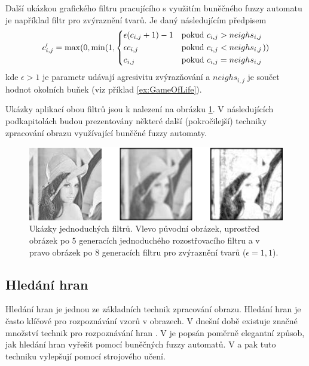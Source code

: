 \documentclass[a4paper,10pt]{article}
\begin{document}
Další ukázkou grafického filtru pracujícího s využitím buněčného fuzzy automatu je například filtr pro zvýraznění tvarů. Je daný následujícím předpisem
$$
  c'_{i,j} = \max(0, \min(1, 
    \begin{dcases}
      \epsilon (c_{i,j} + 1) - 1	& \text{pokud $c_{i,j} > neighs_{i,j}$} \\
      \epsilon c_{i,j}			& \text{pokud $c_{i,j} < neighs_{i,j}$} \\
      c_{i,j}	& \text{pokud $c_{i,j} = neighs_{i,j}$} 
    \end{dcases}
    ))
$$
kde $\epsilon > 1$ je parametr udávají agresivitu zvýrazňování a $neighs_{i,j}$ je součet hodnot okolních buňek (viz příklad \ref{ex:GameOfLife}).

Ukázky aplikací obou filtrů jsou k nalezení na obrázku \ref{img:Filters}. V následujících podkapitolách budou prezentovány některé další (pokročilejší) techniky zpracování obrazu využívající buněčné fuzzy automaty.

\begin{figure}[]
 \includegraphics[width=\textwidth]{filters}
 
 \caption{Ukázky jednoduchých filtrů. Vlevo původní obrázek, uprostřed obrázek po $5$ generacích jednoduchého rozostřovacího filtru a v pravo obrázek po $8$ generacích filtru pro zvýraznění tvarů ($\epsilon = 1,1$).} \label{img:Filters}
\end{figure}

\subsection{Hledání hran}
Hledání hran je jednou ze základních technik zpracování obrazu. Hledání hran je často klíčové pro rozpoznávání vzorů v obrazech. V dnešní době existuje značné množství technik pro rozpoznávání hran \cite{MaiAgg-StuComVarImDetEdTec}. V \cite{MarMeySol-HybMetGasDifModFuzCelAutImSha} je popsán poměrně elegantní způsob, jak hledání hran vyřešit pomocí buněčných fuzzy automatů. V \cite{PatMor-EdgDetTecFuzzLogCEllLeaAutFuzzImPro} a \cite{PatMor-EdgDetTecFuzzLogCEllLeaAutFuzzImPro} pak tuto techniku vylepšují pomocí strojového učení.
\end{document}
